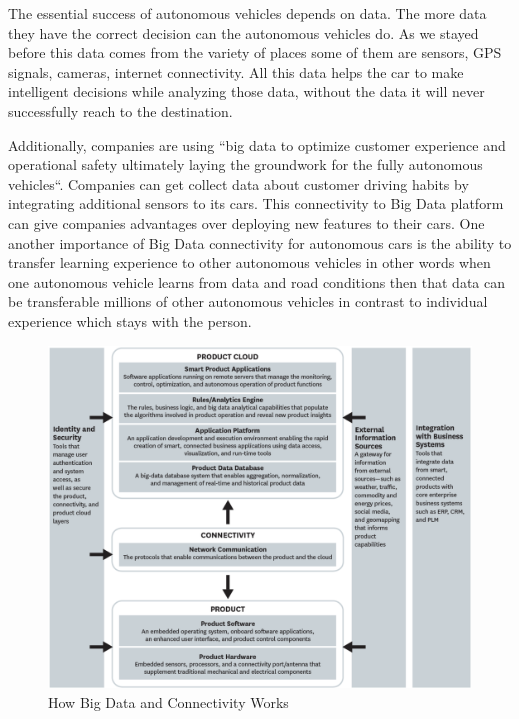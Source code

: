 \documentclass{acm_proc_article-sp}
\begin{document}
\par The essential success of autonomous vehicles depends on data. The more data they have the correct decision can the autonomous vehicles do. As we stayed before this data comes from the variety of places some of them are sensors, GPS signals, cameras, internet connectivity. All this data helps the car to make intelligent decisions while analyzing those data, without the data it will never successfully reach to the destination.\cite{www-kdnuggets}

\par Additionally, companies are using ``big data to optimize customer experience and operational safety ultimately laying the groundwork for the fully autonomous vehicles``.\cite{www-webo} Companies can get collect data about customer driving habits by integrating additional sensors to its cars.\cite{www-hb.org} This connectivity to Big Data platform can give companies advantages over deploying new features to their cars. One another importance of Big Data connectivity for autonomous cars is the ability to transfer learning experience to other autonomous vehicles in other words when one autonomous vehicle learns from data and road conditions then that data can be transferable millions of other autonomous vehicles in contrast to individual experience which stays with the person. \cite{www-hb.org}

\begin{figure}[!ht]
  \centering
      \includegraphics[width=1.0\columnwidth]{images/picture3.png}
  \caption{How Big Data and Connectivity Works}\label{F:connectivity}
\end{figure}
\end{document}
